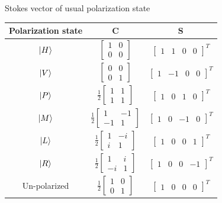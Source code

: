 \documentclass[12pt, dvipsnames]{beamer}
\numberwithin{equation}{section}
\begin{document}
\begin{frame}{Stokes vector of usual polarization state}
	\begin{table}[H]
		\centering
		\begin{tabular}{ c c c } 
			Polarization state &  $\boldsymbol{C}$ & $\boldsymbol{S}$\\
			\hline
			$\ket{H}$ & $\begin{bmatrix}1&0\\0&0\end{bmatrix}$ & $\begin{bmatrix}1&1&0&0\end{bmatrix}^T$\\ \hline
			$\ket{V}$ & $\begin{bmatrix}0&0\\0&1\end{bmatrix}$ & $\begin{bmatrix}1&-1&0&0\end{bmatrix}^T$\\ \hline
			$\ket{P}$ & $\frac{1}{2}\begin{bmatrix}1&1\\1&1\end{bmatrix}$ & $\begin{bmatrix}1&0&1&0\end{bmatrix}^T$\\ \hline
			$\ket{M}$ & $\frac{1}{2}\begin{bmatrix}1&-1\\-1&1\end{bmatrix}$ & $\begin{bmatrix}1&0&-1&0\end{bmatrix}^T$\\ \hline
			$\ket{L}$ & $\frac{1}{2}\begin{bmatrix}1&-i\\i&1\end{bmatrix}$ & $\begin{bmatrix}1&0&0&1\end{bmatrix}^T$\\ \hline
			$\ket{R}$ & $\frac{1}{2}\begin{bmatrix}1&i\\-i&1\end{bmatrix}$ & $\begin{bmatrix}1&0&0&-1\end{bmatrix}^T$\\ \hline
			Un-polarized &  $\frac{1}{2}\begin{bmatrix}1&0\\0&1\end{bmatrix}$ & $\begin{bmatrix}1&0&0&0\end{bmatrix}^T$\\
			\hline
		\end{tabular}
	\end{table}
\end{frame}
\end{document}
